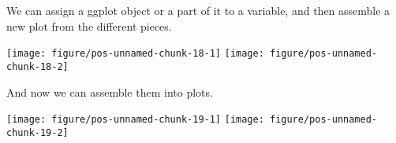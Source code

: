 \documentclass[paper=a4,10pt,div=17,headsepline,BCOR=12mm,twoside,open=right]{scrbook}\usepackage{knitr}
\begin{document}
We can assign a ggplot object or a part of it to a variable, and then assemble a new plot from the different pieces.

\begin{knitrout}\footnotesize
{}\color{fgcolor}\begin{kframe}
\begin{alltt}
 \hlkwb{<-}  \hlstd{(}  \hlstd{=} \hlopt{+}
  \hlstd{()}
 \hlkwb{<-} \hlstd{(}\hlstd{=}\hlstd{,}
       \hlstd{=}\hlstd{,}
       \hlstd{=}\hlstd{,}
       \hlstd{=}\hlstd{,}
       \hlstd{=}\hlstd{)}
 \hlopt{+} 
\end{alltt}
\end{kframe}

{\centering \texttt{[image: figure/pos-unnamed-chunk-18-1]} 
\texttt{[image: figure/pos-unnamed-chunk-18-2]} 

}



\end{knitrout}

And now we can assemble them into plots.

\begin{knitrout}\footnotesize
{}\color{fgcolor}\begin{kframe}
\begin{alltt}
 \hlopt{+}  \hlopt{+} \hlstd{()}
 \hlopt{+}  \hlopt{+} \hlstd{()} \hlopt{+} \hlstd{(}\hlstd{,} \hlstd{)}
\end{alltt}
\end{kframe}

{\centering \texttt{[image: figure/pos-unnamed-chunk-19-1]} 
\texttt{[image: figure/pos-unnamed-chunk-19-2]} 

}



\end{knitrout}
\end{document}
